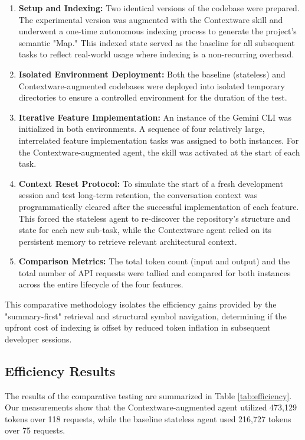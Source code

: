 \documentclass[conference]{IEEEtran}
\begin{document}
\begin{enumerate}
    \item \textbf{Setup and Indexing:} Two identical versions of the codebase were prepared. The experimental version was augmented with the Contextware skill and underwent a one-time autonomous indexing process to generate the project's semantic "Map." This indexed state served as the baseline for all subsequent tasks to reflect real-world usage where indexing is a non-recurring overhead.
    \item \textbf{Isolated Environment Deployment:} Both the baseline (stateless) and Contextware-augmented codebases were deployed into isolated temporary directories to ensure a controlled environment for the duration of the test.
    \item \textbf{Iterative Feature Implementation:} An instance of the Gemini CLI was initialized in both environments. A sequence of four relatively large, interrelated feature implementation tasks was assigned to both instances. For the Contextware-augmented agent, the skill was activated at the start of each task.
    \item \textbf{Context Reset Protocol:} To simulate the start of a fresh development session and test long-term retention, the conversation context was programmatically cleared after the successful implementation of each feature. This forced the stateless agent to re-discover the repository's structure and state for each new sub-task, while the Contextware agent relied on its persistent memory to retrieve relevant architectural context.
    \item \textbf{Comparison Metrics:} The total token count (input and output) and the total number of API requests were tallied and compared for both instances across the entire lifecycle of the four features. 
\end{enumerate}

This comparative methodology isolates the efficiency gains provided by the "summary-first" retrieval and structural symbol navigation, determining if the upfront cost of indexing is offset by reduced token inflation in subsequent developer sessions.

\subsection{Efficiency Results}
The results of the comparative testing are summarized in Table \ref{tab:efficiency}. Our measurements show that the Contextware-augmented agent utilized 473,129 tokens over 118 requests, while the baseline stateless agent used 216,727 tokens over 75 requests. 
\end{document}
